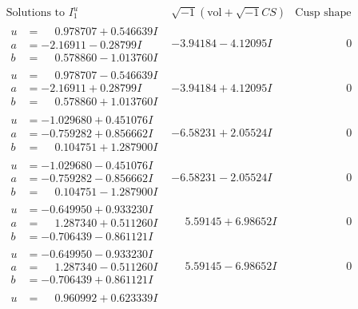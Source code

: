 \documentclass[1p]{elsarticle_modified}
\theoremstyle{definition}
\newcommand{\I}{\sqrt{-1}}
\begin{document}
$$\begin{array}{c|c|c}
\text{Solutions to }I^u_{1}& \I (\text{vol} + \sqrt{-1}CS) & \text{Cusp shape}\\
 \hline 
\begin{aligned}
u &= \phantom{-}0.978707 + 0.546639 I \\
a &= -2.16911 - 0.28799 I \\
b &= \phantom{-}0.578860 - 1.013760 I\end{aligned}
 & -3.94184 - 4.12095 I & \phantom{-0.000000 } 0 \\ \hline\begin{aligned}
u &= \phantom{-}0.978707 - 0.546639 I \\
a &= -2.16911 + 0.28799 I \\
b &= \phantom{-}0.578860 + 1.013760 I\end{aligned}
 & -3.94184 + 4.12095 I & \phantom{-0.000000 } 0 \\ \hline\begin{aligned}
u &= -1.029680 + 0.451076 I \\
a &= -0.759282 + 0.856662 I \\
b &= \phantom{-}0.104751 + 1.287900 I\end{aligned}
 & -6.58231 + 2.05524 I & \phantom{-0.000000 } 0 \\ \hline\begin{aligned}
u &= -1.029680 - 0.451076 I \\
a &= -0.759282 - 0.856662 I \\
b &= \phantom{-}0.104751 - 1.287900 I\end{aligned}
 & -6.58231 - 2.05524 I & \phantom{-0.000000 } 0 \\ \hline\begin{aligned}
u &= -0.649950 + 0.933230 I \\
a &= \phantom{-}1.287340 + 0.511260 I \\
b &= -0.706439 - 0.861121 I\end{aligned}
 & \phantom{-}5.59145 + 6.98652 I & \phantom{-0.000000 } 0 \\ \hline\begin{aligned}
u &= -0.649950 - 0.933230 I \\
a &= \phantom{-}1.287340 - 0.511260 I \\
b &= -0.706439 + 0.861121 I\end{aligned}
 & \phantom{-}5.59145 - 6.98652 I & \phantom{-0.000000 } 0 \\ \hline\begin{aligned}
u &= \phantom{-}0.960992 + 0.623339 I \\

\end{aligned}
\end{array}$$
\end{document}
